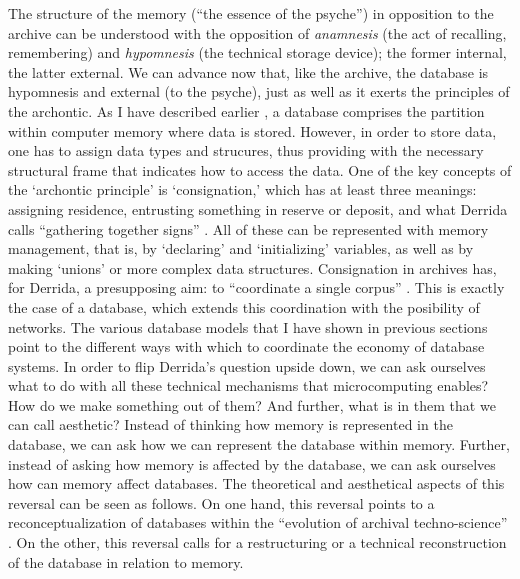 The structure of the memory (``the essence of the psyche'') in opposition to the archive can be understood with the opposition of \textit{anamnesis} (the act of recalling, remembering) and \textit{hypomnesis} (the technical storage device); the former internal, the latter external. We can advance now that, like the archive, the database is hypomnesis and external (to the psyche), just as well as it exerts the principles of the archontic. As I have described earlier , a database comprises the partition within computer memory where data is stored. However, in order to store data, one has to assign data types and strucures, thus providing with the necessary structural frame that indicates how to access the data. One of the key concepts of the `archontic principle' is `consignation,' which has at least three meanings: assigning residence, entrusting something in reserve or deposit, and what Derrida calls ``gathering together signs'' \parencite[10]{Der95:Arc}. All of these can be represented with memory management, that is, by `declaring' and `initializing' variables, as well as by making `unions' or more complex data structures. Consignation in archives has, for Derrida, a presupposing aim: to ``coordinate a single corpus'' \parencite[10]{Der95:Arc}. This is exactly the case of a database, which extends this coordination with the posibility of networks. The various database models that I have shown in previous sections point to the different ways with which to coordinate the economy of database systems. In order to flip Derrida's question upside down, we can ask ourselves what to do with all these technical mechanisms that microcomputing enables? How do we make something out of them? And further, what is in them that we can call aesthetic? Instead of thinking how memory is represented in the database, we can ask how we can represent the database within memory. Further, instead of asking how memory is affected by the database, we can ask ourselves how can memory affect databases. The theoretical and aesthetical aspects of this reversal can be seen as follows. On one hand, this reversal points to a reconceptualization of databases within the ``evolution of archival techno-science'' \parencite[16]{Der95:Arc}. On the other, this reversal calls for a restructuring or a technical reconstruction of the database in relation to memory. 




